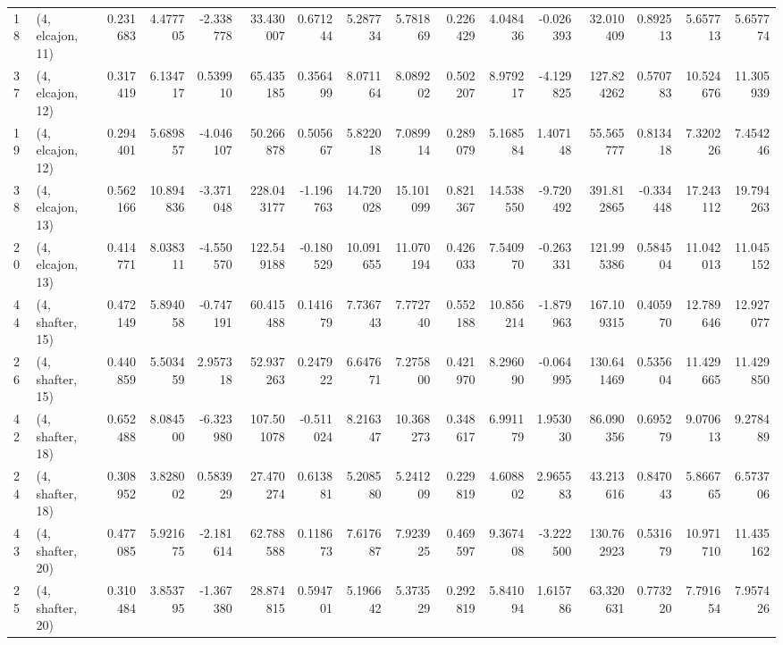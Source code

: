 \begin{tabular}{llrrrrrrrrrrrrrr}
18 &  (4, elcajon, 11) &   0.231683 &   4.477705 & -2.338778 &   33.430007 &  0.671244 &   5.287734 &   5.781869 &  0.226429 &   4.048436 &  -0.026393 &   32.010409 &  0.892513 &   5.657713 &   5.657774 \\
37 &  (4, elcajon, 12) &   0.317419 &   6.134717 &  0.539910 &   65.435185 &  0.356499 &   8.071164 &   8.089202 &  0.502207 &   8.979217 &  -4.129825 &  127.824262 &  0.570783 &  10.524676 &  11.305939 \\
19 &  (4, elcajon, 12) &   0.294401 &   5.689857 & -4.046107 &   50.266878 &  0.505667 &   5.822018 &   7.089914 &  0.289079 &   5.168584 &   1.407148 &   55.565777 &  0.813418 &   7.320226 &   7.454246 \\
38 &  (4, elcajon, 13) &   0.562166 &  10.894836 & -3.371048 &  228.043177 & -1.196763 &  14.720028 &  15.101099 &  0.821367 &  14.538550 &  -9.720492 &  391.812865 & -0.334448 &  17.243112 &  19.794263 \\
20 &  (4, elcajon, 13) &   0.414771 &   8.038311 & -4.550570 &  122.549188 & -0.180529 &  10.091655 &  11.070194 &  0.426033 &   7.540970 &  -0.263331 &  121.995386 &  0.584504 &  11.042013 &  11.045152 \\
44 &  (4, shafter, 15) &   0.472149 &   5.894058 & -0.747191 &   60.415488 &  0.141679 &   7.736743 &   7.772740 &  0.552188 &  10.856214 &  -1.879963 &  167.109315 &  0.405970 &  12.789646 &  12.927077 \\
26 &  (4, shafter, 15) &   0.440859 &   5.503459 &  2.957318 &   52.937263 &  0.247922 &   6.647671 &   7.275800 &  0.421970 &   8.296090 &  -0.064995 &  130.641469 &  0.535604 &  11.429665 &  11.429850 \\
42 &  (4, shafter, 18) &   0.652488 &   8.084500 & -6.323980 &  107.501078 & -0.511024 &   8.216347 &  10.368273 &  0.348617 &   6.991179 &   1.953030 &   86.090356 &  0.695279 &   9.070613 &   9.278489 \\
24 &  (4, shafter, 18) &   0.308952 &   3.828002 &  0.583929 &   27.470274 &  0.613881 &   5.208580 &   5.241209 &  0.229819 &   4.608802 &   2.965583 &   43.213616 &  0.847043 &   5.866765 &   6.573706 \\
43 &  (4, shafter, 20) &   0.477085 &   5.921675 & -2.181614 &   62.788588 &  0.118673 &   7.617687 &   7.923925 &  0.469597 &   9.367408 &  -3.222500 &  130.762923 &  0.531679 &  10.971710 &  11.435162 \\
25 &  (4, shafter, 20) &   0.310484 &   3.853795 & -1.367380 &   28.874815 &  0.594701 &   5.196642 &   5.373529 &  0.292819 &   5.841094 &   1.615786 &   63.320631 &  0.773220 &   7.791654 &   7.957426 \\
\bottomrule
\end{tabular}
